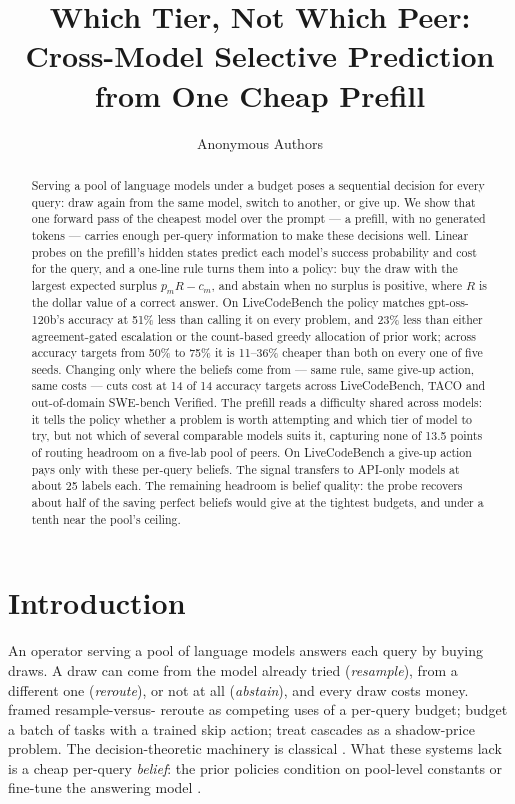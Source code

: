 \documentclass[10pt]{article} %
\title{Which Tier, Not Which Peer: Cross-Model Selective Prediction\\from One Cheap Prefill}
\author{Anonymous Authors}
\begin{document}
\maketitle

\begin{abstract}
Serving a pool of language models under a budget poses a sequential decision for every query:
draw again from the same model, switch to another, or give up.  We show that one forward pass of
the cheapest model over the prompt --- a prefill, with no generated tokens --- carries enough
per-query information to make these decisions well.  Linear probes on the prefill's hidden states
predict each model's success probability and cost for the query, and a one-line rule turns them
into a policy: buy the draw with the largest expected surplus $p_m R - c_m$, and abstain when no
surplus is positive, where $R$ is the dollar value of a correct answer.  On LiveCodeBench the
policy matches gpt-oss-120b's accuracy at 51\% less than calling it on every problem, and 23\%
less than either agreement-gated escalation or the count-based greedy allocation of prior work;
across accuracy targets from 50\% to 75\% it is 11--36\% cheaper than both on every one of five
seeds.  Changing only where the beliefs come from --- same rule, same give-up action, same costs
--- cuts cost at 14 of 14 accuracy targets across LiveCodeBench, TACO and out-of-domain
SWE-bench Verified.  The prefill reads a difficulty shared across models: it tells the policy
whether a problem is worth attempting and which tier of model to try, but not which of several
comparable models suits it, capturing none of 13.5 points of routing headroom on a five-lab pool
of peers.  On LiveCodeBench a give-up action pays only with these per-query beliefs.  The signal transfers to API-only models
at about 25 labels each.  The remaining headroom is belief quality: the probe recovers about half
of the saving perfect beliefs would give at the tightest budgets, and under a tenth near the
pool's ceiling.
\end{abstract}

\section{Introduction}
\label{sec:intro}

An operator serving a pool of language models answers each query by buying draws.  A draw can
come from the model already tried (\emph{resample}), from a different one (\emph{reroute}), or not
at all (\emph{abstain}), and every draw costs money.  \citet{chen2026ror} framed resample-versus-%
reroute as competing uses of a per-query budget; \citet{zhao2026roi} budget a batch of tasks with
a trained skip action; \citet{bouchard2026escalation} treat cascades as a shadow-price problem.
The decision-theoretic machinery is classical \citep{altman1999constrained,weitzman1979optimal}.
What these systems lack is a cheap per-query \emph{belief}: the prior policies condition on
pool-level constants \citep{chen2026ror} or fine-tune the answering model \citep{zhao2026roi}.
\end{document}
